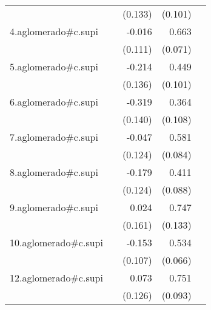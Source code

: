 {\begin{longtable}{l*{4}{D{.}{.}{-1}}}
            &                     &     (0.133)         &     (0.101)         &                     \\
\addlinespace
4.aglomerado#c.supi&                     &      -0.016         &       0.663\sym{***}&                     \\
            &                     &     (0.111)         &     (0.071)         &                     \\
\addlinespace
5.aglomerado#c.supi&                     &      -0.214         &       0.449\sym{***}&                     \\
            &                     &     (0.136)         &     (0.101)         &                     \\
\addlinespace
6.aglomerado#c.supi&                     &      -0.319\sym{*}  &       0.364\sym{***}&                     \\
            &                     &     (0.140)         &     (0.108)         &                     \\
\addlinespace
7.aglomerado#c.supi&                     &      -0.047         &       0.581\sym{***}&                     \\
            &                     &     (0.124)         &     (0.084)         &                     \\
\addlinespace
8.aglomerado#c.supi&                     &      -0.179         &       0.411\sym{***}&                     \\
            &                     &     (0.124)         &     (0.088)         &                     \\
\addlinespace
9.aglomerado#c.supi&                     &       0.024         &       0.747\sym{***}&                     \\
            &                     &     (0.161)         &     (0.133)         &                     \\
\addlinespace
10.aglomerado#c.supi&                     &      -0.153         &       0.534\sym{***}&                     \\
            &                     &     (0.107)         &     (0.066)         &                     \\
\addlinespace
12.aglomerado#c.supi&                     &       0.073         &       0.751\sym{***}&                     \\
            &                     &     (0.126)         &     (0.093)         &                     \\

\end{longtable}}
